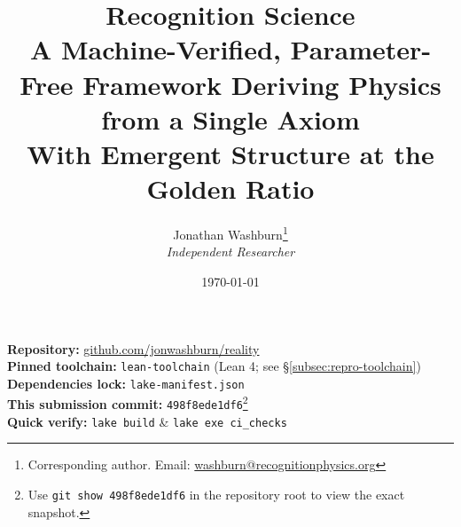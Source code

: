 \documentclass[11pt,a4paper,twoside]{article}
\title{%
    \vspace{-2em}%
    {\huge\bfseries Recognition Science}\\[1em]
    {\Large A Machine-Verified, Parameter-Free Framework Deriving Physics from a Single Axiom}\\[0.8em]
    {\large With Emergent Structure at the Golden Ratio}\\[1.5em]
}
\author{
    Jonathan Washburn\thanks{Corresponding author. Email: \href{mailto:washburn@recognitionphysics.org}{washburn@recognitionphysics.org}}\\
    \textit{Independent Researcher}
}
\date{\today}
\numberwithin{equation}{section}
\theoremstyle{customthm}
\theoremstyle{customdef}
\theoremstyle{customrem}
\begin{document}
\maketitle

\begin{importantbox}
\small
\textbf{Repository:} \href{https://github.com/jonwashburn/reality}{github.com/jonwashburn/reality}\\
\textbf{Pinned toolchain:} \texttt{lean-toolchain} (Lean 4; see \S\ref{subsec:repro-toolchain})\\
\textbf{Dependencies lock:} \texttt{lake-manifest.json}\\
\textbf{This submission commit:} \texttt{498f8ede1df6}\footnote{Use \texttt{git show 498f8ede1df6} in the repository root to view the exact snapshot.}\\
\textbf{Quick verify:} \texttt{lake build} \;\&\; \texttt{lake exe ci\_checks}
\end{importantbox}
\end{document}
